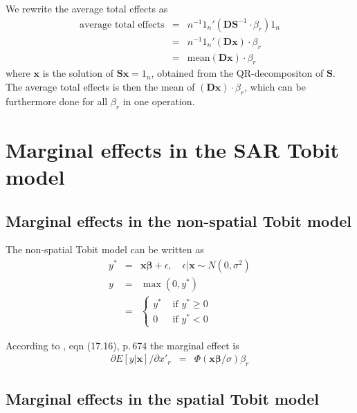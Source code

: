 \documentclass[a4paper]{article}
\def\bfx{\mbox{$\boldsymbol{\mathbf{x}}$}}
\def\bfbeta{\mbox{$\boldsymbol{\beta}$}}
\def\bfD{\mbox{$\boldsymbol{\mathbf{D}}$}}
\def\bfS{\mbox{$\boldsymbol{\mathbf{S}}$}}
\begin{document}
We rewrite the average total effects as
\begin{eqnarray}
\text{average total effects} & = & n^{-1} 1_n' (\bfD \bfS^{-1} \cdot \beta_r) 1_n \\
                             & = & n^{-1} 1_n' (\bfD \bfx) \cdot \beta_r \nonumber \\
                             & = & \text{mean}(\bfD \bfx) \cdot \beta_r \nonumber
\end{eqnarray}
where $\bfx$ is the solution of $\bfS \bfx = 1_n$, obtained from the QR-decompositon
of $\bfS$. The average total effects is then the mean of $(\bfD \bfx) \cdot \beta_r$, which can be furthermore done for all $\beta_r$ in one operation.

\section{Marginal effects in the SAR Tobit model}

\subsection{Marginal effects in the non-spatial Tobit model}

The non-spatial Tobit model can be written as
\begin{eqnarray}
  y^{*} & = & \bfx \bfbeta + \epsilon, \quad \epsilon | \bfx \sim N(0, \sigma^2) \\
	y     & = & \max(0, y^{*})\\
	      & = & \left\{ 
	              \begin{array}{cc}
								  y^{*} & \text{ if } y^{*} \ge 0  \\
									0 & \text{ if } y^{*} < 0
								\end{array}
	            \right.
\end{eqnarray}

According to \cite{Wooldridge2010}, eqn (17.16), p.\,674 the marginal effect is
\begin{eqnarray}
 \partial E[y | \bfx ] / \partial x'_r & = & \Phi(\bfx \bfbeta / \sigma) \beta_r
\end{eqnarray}

\subsection{Marginal effects in the spatial Tobit model}
\end{document}
